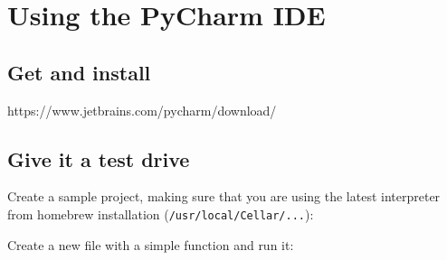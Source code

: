 \chapter{Using the PyCharm IDE}

\setcounter{problem}{1}

\section{Get and install}

\begin{fullwidth}

https://www.jetbrains.com/pycharm/download/

\section{Give it a test drive}

\noindent Create a sample project, making sure that you are using the latest interpreter from homebrew installation ({\tt /usr/local/Cellar/...}):


\noindent Create a new file with a simple function and run it:



\end{fullwidth}

